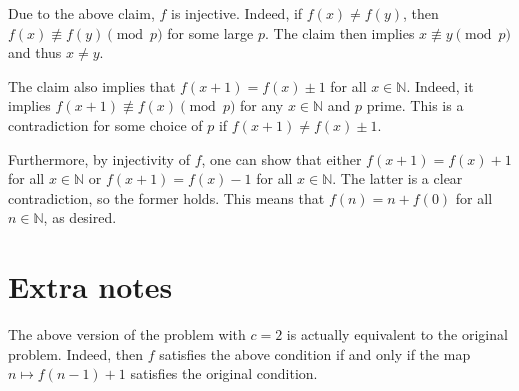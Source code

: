 \documentclass{article}
\newcommand{\N}{\mathbb{N}}
\begin{document}
Due to the above claim, $f$ is injective.
Indeed, if $f(x) \neq f(y)$, then $f(x) \not\equiv f(y) \pmod{p}$ for some large $p$.
The claim then implies $x \not\equiv y \pmod{p}$ and thus $x \neq y$.

The claim also implies that $f(x + 1) = f(x) \pm 1$ for all $x \in \N$.
Indeed, it implies $f(x + 1) \not\equiv f(x) \pmod{p}$ for any $x \in \N$ and $p$ prime.
This is a contradiction for some choice of $p$ if $f(x + 1) \neq f(x) \pm 1$.

Furthermore, by injectivity of $f$, one can show that either $f(x + 1) = f(x) + 1$ for all $x \in \N$ or $f(x + 1) = f(x) - 1$ for all $x \in \N$.
The latter is a clear contradiction, so the former holds.
This means that $f(n) = n + f(0)$ for all $n \in \N$, as desired.



\section*{Extra notes}

The above version of the problem with $c = 2$ is actually equivalent to the original problem.
Indeed, then $f$ satisfies the above condition if and only if the map $n \mapsto f(n - 1) + 1$ satisfies the original condition.
\end{document}
